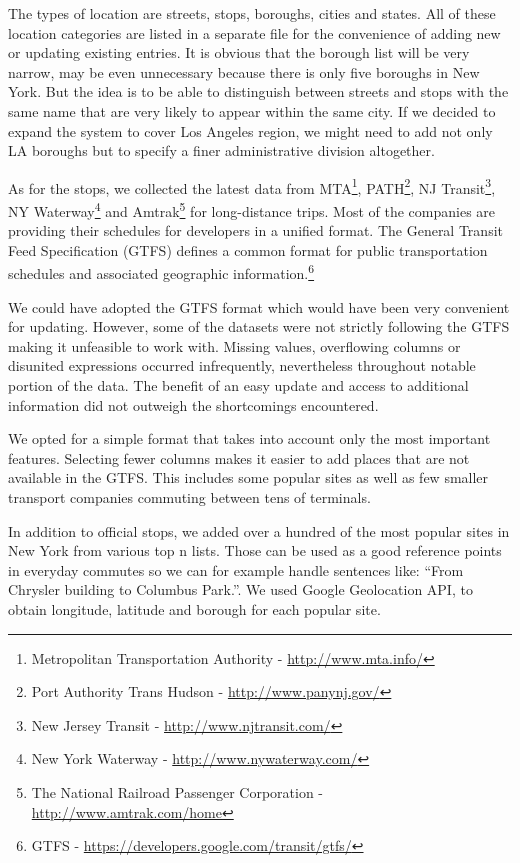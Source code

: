 The types of location are streets, stops, boroughs, cities and states.
All of these location categories are listed in a separate file for the convenience of adding new or updating existing entries.
It is obvious that the borough list will be very narrow, may be even unnecessary because there is only five boroughs in New York.
But the idea is to be able to distinguish between streets and stops with the same name that are very likely to appear within the same city.
If we decided to expand the system to cover Los Angeles region, we might need to add not only LA boroughs but to specify a finer administrative division altogether.

As for the stops, we collected the latest data from
MTA\footnote{Metropolitan Transportation Authority - \url{http://www.mta.info/}},
PATH\footnote{Port Authority Trans Hudson - \url{http://www.panynj.gov/}},
NJ Transit\footnote{New Jersey Transit - \url{http://www.njtransit.com/}},
NY Waterway\footnote{New York Waterway - \url{http://www.nywaterway.com/}} and
Amtrak\footnote{The National Railroad Passenger Corporation - \url{http://www.amtrak.com/home}} for long-distance trips.
Most of the companies are providing their schedules for developers in a unified format.
The General Transit Feed Specification (GTFS) defines a common format for public transportation schedules and associated geographic information.\footnote{GTFS - \url{https://developers.google.com/transit/gtfs/}}

We could have adopted the GTFS format which would have been very convenient for updating.
However, some of the datasets were not strictly following the GTFS making it unfeasible to work with.
Missing values, overflowing columns or disunited expressions occurred infrequently, nevertheless throughout notable portion of the data.
The benefit of an easy update and access to additional information did not outweigh the shortcomings encountered.

We opted for a simple format that takes into account only the most important features.
Selecting fewer columns makes it easier to add places that are not available in the GTFS.
This includes some popular sites as well as few smaller transport companies commuting between tens of terminals.

In addition to official stops, we added over a hundred of the most popular sites in New York from various top n lists.
Those can be used as a good reference points in everyday commutes so we can for example handle sentences like: ``From Chrysler building to Columbus Park.''.
We used Google Geolocation API, to obtain longitude, latitude and borough for each popular site.


